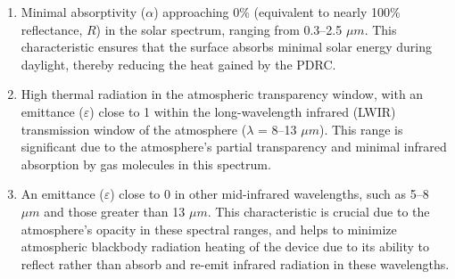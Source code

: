 \begin{enumerate} 
\item Minimal absorptivity ($\alpha$) approaching 0\% (equivalent to nearly 100\% reflectance, $R$) in the solar spectrum, ranging from 0.3–2.5 $\mu m$. This characteristic ensures that the surface absorbs minimal solar energy during daylight, thereby reducing the heat gained by the PDRC.
\item High thermal radiation in the atmospheric transparency window, with an emittance ($\varepsilon$) close to 1 within the long-wavelength infrared (LWIR) transmission window of the atmosphere ($\lambda$ = 8–13 $\mu m$). This range is significant due to the atmosphere's partial transparency and minimal infrared absorption by gas molecules in this spectrum.
\item An emittance ($\varepsilon$) close to 0 in other mid-infrared wavelengths, such as 5–8 $\mu m$ and those greater than 13 $\mu m$. This characteristic is crucial due to the atmosphere's opacity in these spectral ranges, and helps to minimize atmospheric blackbody radiation heating of the device due to its ability to reflect rather than absorb and re-emit infrared radiation in these wavelengths.
\end{enumerate}



